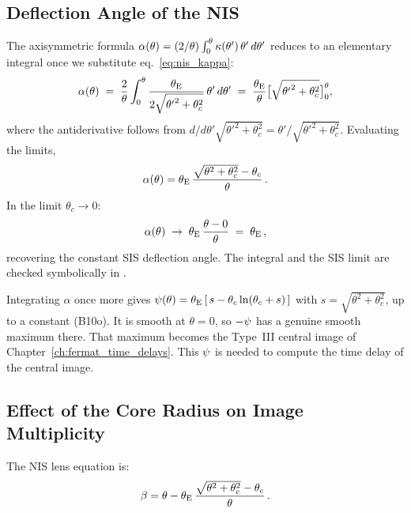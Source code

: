 \subsection{Deflection Angle of the NIS}

The axisymmetric formula $\alpha(\theta) = (2/\theta)\int_0^\theta
\kappa(\theta')\,\theta'\,d\theta'$ reduces to an elementary
integral once we substitute eq.~\eqref{eq:nis_kappa}:
\begin{equation*}
    \alpha(\theta)
    \;=\; \frac{2}{\theta}\int_0^\theta
        \frac{\theta_{\mathrm{E}}}{2\sqrt{{\theta'}^2+\theta_c^2}}\,\theta'\,d\theta'
    \;=\; \frac{\theta_{\mathrm{E}}}{\theta}\bigl[\sqrt{{\theta'}^2+\theta_c^2}\bigr]_0^\theta,
\end{equation*}
where the antiderivative follows from
$d/d\theta'\sqrt{{\theta'}^2+\theta_c^2} = \theta'/\sqrt{{\theta'}^2+\theta_c^2}$.
Evaluating the limits,
\begin{equation}
    \alpha(\theta) = \theta_{\mathrm{E}}\,
    \frac{\sqrt{\theta^2 + \theta_c^2} - \theta_c}{\theta} \,.
    \label{eq:nis_alpha}
\end{equation}
In the limit $\theta_c \to 0$:
\begin{equation}
    \alpha(\theta) \;\to\; \theta_{\mathrm{E}}\,\frac{\theta - 0}{\theta}
    \;=\; \theta_{\mathrm{E}} \,,
    \label{eq:nis_alpha_limit}
\end{equation}
recovering the constant SIS deflection angle.  The integral and the
SIS limit are checked symbolically in
.

\begin{annotation}
Integrating $\alpha$ once more gives
$\psi(\theta) = \theta_{\mathrm{E}}\,[\,s-\theta_c\ln(\theta_c+s)\,]$ with $s = \sqrt{\theta^2+\theta_c^2}$,
up to a constant (B10o).  It is smooth at $\theta = 0$, so $-\psi$ has a
genuine smooth maximum there.  That maximum becomes the Type~III central
image of Chapter~\ref{ch:fermat_time_delays}.  This $\psi$ is needed to compute
the time delay of the central image.
\end{annotation}

\subsection{Effect of the Core Radius on Image Multiplicity}

The NIS lens equation is:
\begin{equation}
    \beta = \theta - \theta_{\mathrm{E}}\,
    \frac{\sqrt{\theta^2 + \theta_c^2} - \theta_c}{\theta} \,.
    \label{eq:nis_lens_eq}
\end{equation}

